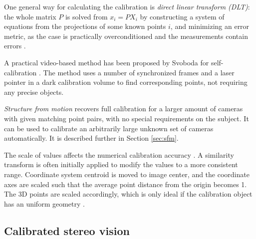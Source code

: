 One general way for calculating the calibration is \emph{direct linear transform (DLT)}:
the whole matrix $P$ is solved from $x_i = PX_i$ by constructing a system of equations from the projections of some known points $i$, and minimizing an error metric, as the case is practically overconditioned and the measurements contain errors \cite{hartley03multiview}.

A practical video-based method has been proposed by Svoboda for self-calibration \cite{svoboda2005convenient}.
The method uses a number of synchronized frames and a laser pointer in a dark calibration volume to find corresponding points, not requiring any precise objects.

\emph{Structure from motion} recovers full calibration for a larger amount of cameras with given matching point pairs, with no special requirements on the subject.
It can be used to calibrate an arbitrarily large unknown set of cameras automatically.
It is described further in Section \ref{sec:sfm}.





The scale of values affects the numerical calibration accuracy \cite{hartley1997defense,hartley03multiview}.
A similarity transform is often initially applied to modify the values to a more consistent range.
Coordinate system centroid is moved to image center, and the coordinate axes are scaled such that the average point distance from the origin becomes 1.
The 3D points are scaled accordingly, which is only ideal if the calibration object has an uniform geometry \cite{hartley03multiview}.


\subsection{Calibrated stereo vision} %

